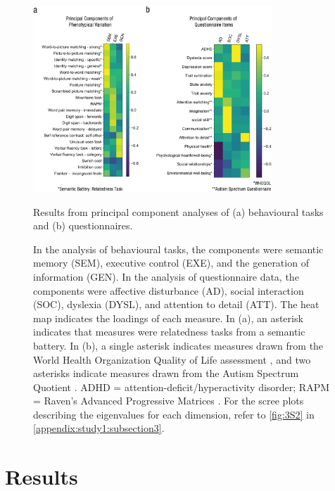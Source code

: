 \begin{figure}[p]
	\centering
	\includegraphics[width=0.8\textwidth]{study1/image/study1fig3.jpeg}
	\caption{Results from principal component analyses of (a) behavioural tasks and (b) questionnaires.}
	\caption*{\footnotesize{In the analysis of behavioural tasks, the components were semantic memory (SEM), executive control (EXE), and the generation of information (GEN). In the analysis of questionnaire data, the components were affective disturbance (AD), social interaction (SOC), dyslexia (DYSL), and attention to detail (ATT). The heat map indicates the loadings of each measure. In (a), an asterisk indicates that measures were relatedness tasks from a semantic battery. In (b), a single asterisk indicates measures drawn from the World Health Organization Quality of Life assessment \cite{WHOQOL2002}, and two asterisks indicate measures drawn from the Autism Spectrum Quotient \cite{Baron-Cohen2001}. ADHD = attention-deficit/hyperactivity disorder; RAPM = Raven's Advanced Progressive Matrices \cite{Raven1998}. For the scree plots describing the eigenvalues for each dimension, refer to \cref{fig:3S2} in \cref{appendix:study1:subsection3}.}}
	\label{fig:study1:fig3}
\end{figure}

\section{Results}
\label{study1:results}

